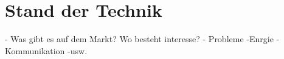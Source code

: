 \section{Stand der Technik}
- Was gibt es auf dem Markt? Wo besteht interesse?
- Probleme
	-Enrgie
	-Kommunikation
	-usw.
